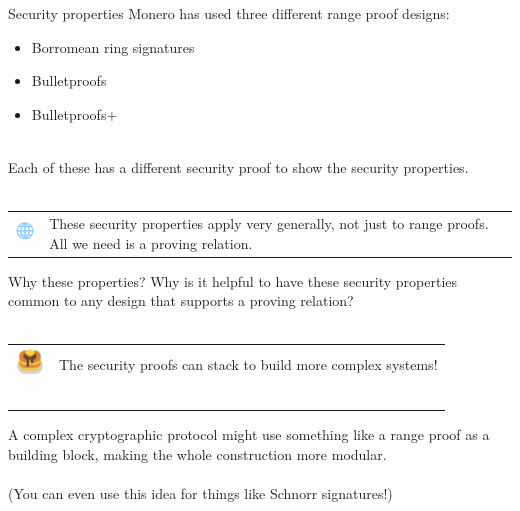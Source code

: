\documentclass[aspectratio=169]{beamer}
\begin{document}
\begin{frame}{Security properties}
    Monero has used three different range proof designs:
    \begin{itemize}
        \item Borromean ring signatures
        \item Bulletproofs
        \item Bulletproofs+ \\~\\
    \end{itemize}

    Each of these has a different security proof to show the security properties. \\~\\

    \begin{tabular}{>{\arraybackslash}m{40px} >{\arraybackslash}m{320px}}
        \includegraphics[width=30px]{images/globe.png} & These security properties apply very generally, not just to range proofs.
        All we need is a proving relation.
    \end{tabular}
\end{frame}

\begin{frame}{Why these properties?}
    Why is it helpful to have these security properties common to any design that supports a proving relation? \\~\\

    \begin{tabular}{>{\arraybackslash}m{40px} >{\arraybackslash}m{320px}}
        \includegraphics[width=30px]{images/pancakes.png} & The security proofs can stack to build more complex systems! \\~\\
    \end{tabular}

    A complex cryptographic protocol might use something like a range proof as a building block, making the whole construction more modular. \\~\\

    (You can even use this idea for things like Schnorr signatures!)
\end{frame}
\end{document}
